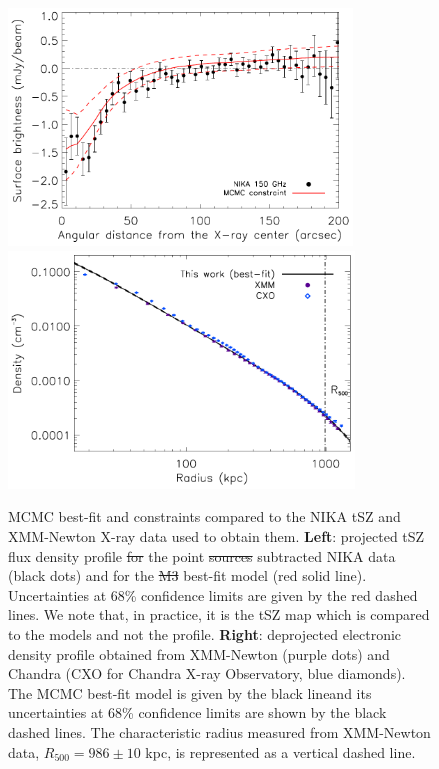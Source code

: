 \documentclass[twocolumn,traditabstract]{aa}
\providecommand{\DIFaddtex}[1]{{\protect\color{blue}\uwave{#1}}} %
\providecommand{\DIFdeltex}[1]{{\protect\color{red}\sout{#1}}}                      %
\providecommand{\DIFaddFL}[1]{\DIFadd{#1}} %
\providecommand{\DIFdelFL}[1]{\DIFdel{#1}} %
\providecommand{\DIFaddbeginFL}{} %
\providecommand{\DIFaddendFL}{} %
\providecommand{\DIFdelbeginFL}{} %
\providecommand{\DIFdelendFL}{} %
\providecommand{\DIFadd}[1]{\texorpdfstring{\DIFaddtex{#1}}{#1}} %
\providecommand{\DIFdel}[1]{\texorpdfstring{\DIFdeltex{#1}}{}} %
\begin{document}
\begin{figure}[h]
\centering
\includegraphics[height=6.3cm]{Figure/MACSJ1424_profile_ML.pdf}
\includegraphics[height=6.3cm]{Figure/ICM_density_profile.pdf}
\caption{\DIFaddbeginFL \footnotesize \DIFaddendFL MCMC best-fit and constraints compared to the NIKA tSZ and XMM-Newton X-ray data used to obtain them. {\bf Left}: projected tSZ flux density profile \DIFdelbeginFL \DIFdelFL{for }\DIFdelendFL \DIFaddbeginFL \DIFaddFL{from }\DIFaddendFL the point \DIFdelbeginFL \DIFdelFL{sources }\DIFdelendFL \DIFaddbeginFL \DIFaddFL{source }\DIFaddendFL subtracted NIKA data (black dots) and for the \DIFdelbeginFL \DIFdelFL{M3 }\DIFdelendFL best-fit \DIFaddbeginFL \DIFaddFL{M3 }\DIFaddendFL model (red solid line). Uncertainties at 68\% confidence limits are given by the red dashed lines. We note that, in practice, it is the tSZ map which is compared to the models and not the profile. {\bf Right}: deprojected electronic density profile obtained from XMM-Newton (purple dots) and Chandra (CXO for Chandra X-ray Observatory, blue diamonds). The MCMC best-fit model is given by the black line\DIFaddbeginFL \DIFaddFL{, }\DIFaddendFL and its uncertainties at 68\% confidence limits are shown by the black dashed lines. The characteristic radius measured from XMM-Newton data, $R_{500} = 986 \pm 10$ kpc, is represented as a vertical dashed line.}
\label{fig:MACSJ1424_MCMC_vs_data}
\end{figure}
\end{document}
